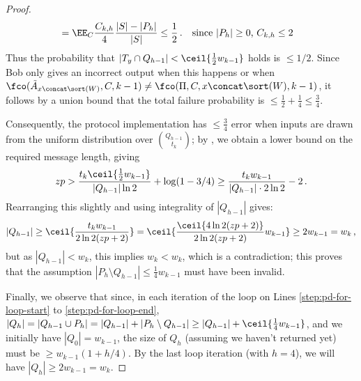 \begin{itemize}
\begin{itemize}
\begin{proof}
\begin{align*}
      &= \EE_C \frac{C_{k,h}}{4} \frac{|S|-|P_h|}{|S|} \le \frac{1}{2} \,. &&\text{since $|P_h|\ge 0$, $C_{k,h} \le 2$} 
  \end{align*}
  Thus the probability that $|T_y \cap Q_{h-1}| < \ceil{\frac{1}{2} w_{k-1}}$
  holds is $\le 1/2$. Since Bob only gives an incorrect output when this
  happens or when $\fco(\tilde{A}_{x \concat \sort(W)}, C, k-1) \ne
  \fco(\Pi, C, x \concat \sort(W), k-1)$, it follows by a union bound that
  the total failure probability is $\le \frac{1}{2} + \frac{1}{4} \le
  \frac{3}{4}$.
  
  Consequently, the protocol implementation has $\le \frac{3}{4}$ error when inputs are drawn from the uniform distribution over $\binom{Q_{h-1}}{t_k}$; by , we 
  obtain a lower bound on the required message length, giving
  \begin{align*}
    z p > \frac{t_k \ceil{\frac{1}{2} w_{k-1}}}{|Q_{h-1}| \ln 2} + \log(1 - 3/4) \ge \frac{t_k w_{k-1}}{|Q_{h-1}| \cdot 2 \ln  2} - 2 \,.
  \end{align*}
  Rearranging this slightly and using integrality of $|Q_{h-1}|$ gives:
  \begin{align*}
    |Q_{h-1}| \ge \ceil{\frac{t_k w_{k-1}}{2 \ln  2 (zp+2) }} = \ceil{\frac{\ceil{4 \ln 2 (zp + 2)}}{2 \ln  2 (zp+2) } w_{k-1}} \ge 2 w_{k-1} = w_k \,,
  \end{align*}
  but as $|Q_{h-1}| < w_k$, this implies $w_k < w_k$, which is a
  contradiction; this proves that the assumption $|P_h \setminus Q_{h-1}| \le
  \frac{1}{4} w_{k-1}$ must have been invalid.
  
  Finally, we observe that since, in each iteration of the loop on Lines \ref{step:pd-for-loop-start} to \ref{step:pd-for-loop-end},
  $|Q_h| = |Q_{h-1} \cup P_{h}| = |Q_{h-1}| + |P_{h} \setminus Q_{h-1}| \ge |Q_{h-1}| + \ceil{\frac{1}{4} w_{k-1}}$,
  and we initially have $|Q_0| = w_{k-1}$, the size of $Q_h$ (assuming we haven't returned yet)
  must be $\ge w_{k-1} (1 + h / 4)$. By the last loop iteration (with $h=4$), we will have $|Q_h| \ge 2 w_{k-1} = w_k$.
\end{proof}



\end{itemize}
\end{itemize}
